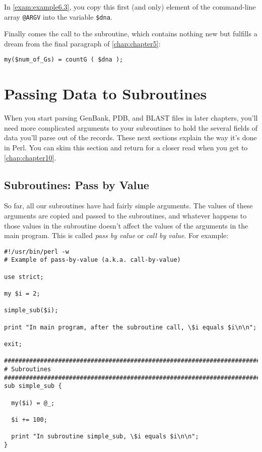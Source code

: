 In \autoref{exam:example6.3}, you copy this first (and only) element of the command-line array \verb|@ARGV| into the variable \verb|$dna|.

Finally comes the call to the subroutine, which contains nothing new but fulfills a dream from the final paragraph of \autoref{chap:chapter5}:

\begin{lstlisting}
my($num_of_Gs) = countG ( $dna );
\end{lstlisting}

\section{Passing Data to Subroutines}
When you start parsing GenBank, PDB, and BLAST files in later chapters, you'll need more complicated arguments to your subroutines to hold the several fields of data you'll parse out of the records. These next sections explain the way it's done in Perl. You can skim this section and return for a closer read when you get to \autoref{chap:chapter10}. 

\subsection{Subroutines: Pass by Value}
\label{sect:section6.4.1}
So far, all our subroutines have had fairly simple arguments. The values of these arguments are copied and passed to the subroutines, and whatever happens to those values in the subroutine doesn't affect the values of the arguments in the main program. This is called \textit{pass by value} or \textit{call by value}. For example: 

\begin{lstlisting}
#!/usr/bin/perl -w
# Example of pass-by-value (a.k.a. call-by-value)

use strict;

my $i = 2;

simple_sub($i);

print "In main program, after the subroutine call, \$i equals $i\n\n";

exit;

################################################################################
# Subroutines
################################################################################
sub simple_sub {

  my($i) = @_;

  $i += 100;

  print "In subroutine simple_sub, \$i equals $i\n\n";
}
\end{lstlisting}

